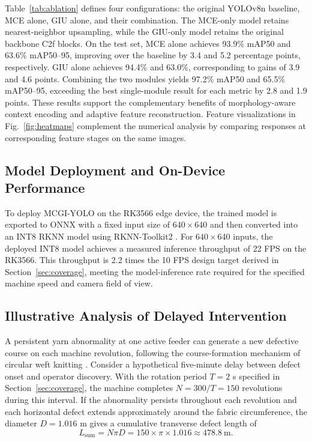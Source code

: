 \documentclass[journal]{IEEEtranTIE}
\newcommand{\model}{MCGI-YOLO\xspace}
\begin{document}
Table~\ref{tab:ablation} defines four configurations: the original YOLOv8n baseline, MCE alone, GIU alone, and their combination. The MCE-only model retains nearest-neighbor upsampling, while the GIU-only model retains the original backbone C2f blocks. On the test set, MCE alone achieves 93.9\% mAP50 and 63.6\% mAP50--95, improving over the baseline by 3.4 and 5.2 percentage points, respectively. GIU alone achieves 94.4\% and 63.0\%, corresponding to gains of 3.9 and 4.6 points. Combining the two modules yields 97.2\% mAP50 and 65.5\% mAP50--95, exceeding the best single-module result for each metric by 2.8 and 1.9 points. These results support the complementary benefits of morphology-aware context encoding and adaptive feature reconstruction. Feature visualizations in Fig.~\ref{fig:heatmaps} complement the numerical analysis by comparing responses at corresponding feature stages on the same images.



\subsection{Model Deployment and On-Device Performance}
\label{sec:deployment}
To deploy \model on the RK3566 edge device, the trained model is exported to ONNX with a fixed input size of $640\times$640 and then converted into an INT8 RKNN model using RKNN-Toolkit2 \cite{rockchiptoolkit2}. For $640\times$640 inputs, the deployed INT8 model achieves a measured inference throughput of 22 FPS on the RK3566. This throughput is 2.2 times the 10 FPS design target derived in Section~\ref{sec:coverage}, meeting the model-inference rate required for the specified machine speed and camera field of view.



\subsection{Illustrative Analysis of Delayed Intervention}
\label{sec:delayed-intervention}
A persistent yarn abnormality at one active feeder can generate a new defective course on each machine revolution, following the course-formation mechanism of circular weft knitting \cite{cottonworksKnitMachinery}. Consider a hypothetical five-minute delay between defect onset and operator discovery. With the rotation period $T=2$ s specified in Section~\ref{sec:coverage}, the machine completes $N=300/T=150$ revolutions during this interval. If the abnormality persists throughout each revolution and each horizontal defect extends approximately around the fabric circumference, the diameter $D=1.016$ m gives a cumulative transverse defect length of
\begin{equation}
L_{\mathrm{sum}}=N\pi D
=150\times\pi\times1.016
\approx478.8\ \mathrm{m}.
\label{eq:cumulative-defect-length}
\end{equation}
\end{document}
